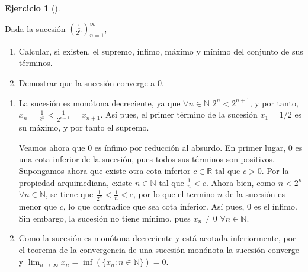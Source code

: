 \documentclass[
  spanish,
  a4paper,
]{scrreport}
\providecommand{\tightlist}{%
  \setlength{\itemsep}{0pt}\setlength{\parskip}{0pt}}
\theoremstyle{definition}
\newtheorem{exercise}{Ejercicio}[chapter]
\theoremstyle{remark}
\begin{document}
\begin{exercise}[]\protect\hypertarget{exr-2}{}\label{exr-2}

Dada la sucesión \(\left(\frac{1}{2^n}\right)_{n=1}^\infty\),

\begin{enumerate}
\def\labelenumi{\alph{enumi}.}
\tightlist
\item
  Calcular, si existen, el supremo, ínfimo, máximo y mínimo del conjunto
  de sus términos.
\item
  Demostrar que la sucesión converge a \(0\).
\end{enumerate}

\end{exercise}

\begin{tcolorbox}[enhanced jigsaw, arc=.35mm, bottomrule=.15mm, bottomtitle=1mm, breakable, colback=white, colbacktitle=quarto-callout-tip-color!10!white, colframe=quarto-callout-tip-color-frame, coltitle=black, left=2mm, leftrule=.75mm, opacityback=0, opacitybacktitle=0.6, rightrule=.15mm, title=\textcolor{quarto-callout-tip-color}{\faLightbulb}\hspace{0.5em}{Solución}, titlerule=0mm, toprule=.15mm, toptitle=1mm]

\begin{enumerate}
\def\labelenumi{\alph{enumi}.}
\item
  La sucesión es monótona decreciente, ya que \(\forall n\in\mathbb{N}\)
  \(2^n<2^{n+1}\), y por tanto,
  \(x_n=\frac{1}{2^n}<\frac{1}{2^{n+1}}=x_{n+1}\). Así pues, el primer
  término de la sucesión \(x_1=1/2\) es su máximo, y por tanto el
  supremo.

  Veamos ahora que \(0\) es ínfimo por reducción al absurdo. En primer
  lugar, \(0\) es una cota inferior de la sucesión, pues todos sus
  términos son positivos. Supongamos ahora que existe otra cota inferior
  \(c\in\mathbb{R}\) tal que \(c>0\). Por la propiedad arquimediana,
  existe \(n\in\mathbb{N}\) tal que \(\frac{1}{n}< c\). Ahora bien, como
  \(n<2^n\) \(\forall n\in\mathbb{N}\), se tiene que
  \(\frac{1}{2^n}<\frac{1}{n}< c\), por lo que el termino \(n\) de la
  sucesión es menor que \(c\), lo que contradice que sea cota inferior.
  Así pues, \(0\) es el ínfimo. Sin embargo, la sucesión no tiene
  mínimo, pues \(x_n\neq 0\) \(\forall n\in\mathbb{N}\).
\item
  Como la sucesión es monótona decreciente y está acotada inferiormente,
  por el
  \href{https://aprendeconalf.es/analisis-manual/sucesiones.html\#thm-convergencia-monotona}{teorema
  de la convergencia de una sucesión monónota} la sucesión converge y
  \(\lim_{n\to\infty}x_n = \inf(\{x_n:n\in\mathbb{N}\})=0\).
\end{enumerate}

\end{tcolorbox}
\end{document}
